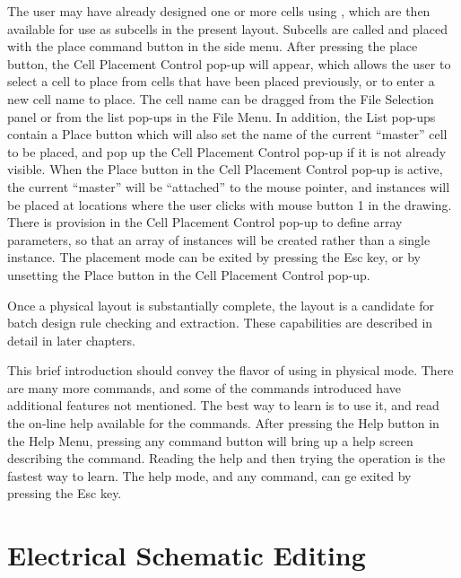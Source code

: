 The user may have already designed one or more cells using {\Xic},
which are then available for use as subcells in the present layout. 
Subcells are called and placed with the {\cb place} command button in
the side menu.  After pressing the {\cb place} button, the {\cb Cell
Placement Control} pop-up will appear, which allows the user to select
a cell to place from cells that have been placed previously, or to
enter a new cell name to place.  The cell name can be dragged from the
{\cb File Selection} panel or from the list pop-ups in the {\cb File
Menu}.  In addition, the {\cb List} pop-ups contain a {\cb Place}
button which will also set the name of the current ``master'' cell to
be placed, and pop up the {\cb Cell Placement Control} pop-up if it is
not already visible.  When the {\cb Place} button in the {\cb Cell
Placement Control} pop-up is active, the current ``master'' will be
``attached'' to the mouse pointer, and instances will be placed at
locations where the user clicks with mouse button 1 in the drawing. 
There is provision in the {\cb Cell Placement Control} pop-up to
define array parameters, so that an array of instances will be created
rather than a single instance.  The placement mode can be exited by
pressing the {\kb Esc} key, or by unsetting the {\cb Place} button in
the {\cb Cell Placement Control} pop-up.

Once a physical layout is substantially complete, the layout is a
candidate for batch design rule checking and extraction.  These
capabilities are described in detail in later chapters.

This brief introduction should convey the flavor of using {\Xic} in
physical mode.  There are many more commands, and some of the commands
introduced have additional features not mentioned.  The best way to
learn {\Xic} is to use it, and read the on-line help available for the
commands.  After pressing the {\cb Help} button in the {\cb Help Menu},
pressing any command button will bring up a help screen describing the
command.  Reading the help and then trying the operation is the
fastest way to learn.  The help mode, and any command, can ge exited
by pressing the {\kb Esc} key.


\section{Electrical Schematic Editing}

